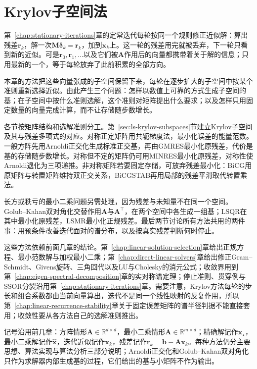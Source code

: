 \chapter{Krylov子空间法}
\label{sec:ls-krylov-iterations}
\label{chap:krylov-methods}

第~\ref{chap:stationary-iterations}章的定常迭代每轮按同一个规则修正近似解：算出残差$\bm r_k$，解一次$\bm M\bm\delta_k=\bm r_k$，加到$\bm x_k$上。这一轮的残差用完就被丢弃，下一轮只看到新的近似。可是$\bm r_0,\bm r_1,\ldots$以及它们被$\bm A$作用后的向量都携带着关于解的信息；只用最新的一个，等于每轮放弃了此前积累的全部方向。

本章的方法把这些向量张成的子空间保留下来，每轮在逐步扩大的子空间中按某个准则重新选择近似。由此产生三个问题：怎样以数值上可靠的方式生成子空间的基；在子空间中按什么准则选解，这个准则对矩阵提出什么要求；以及怎样只用固定数量的向量完成计算，而不让存储随步数增长。

各节按矩阵结构和选解准则分工。第~\ref{sec:ls-krylov-subspaces}节建立Krylov子空间及其与残差多项式的对应。对称正定矩阵用共轭梯度法，最小化误差的能量范数。一般方阵先用Arnoldi正交化生成标准正交基，再由GMRES最小化原残差，代价是基的存储随步数增长。对称但不定的矩阵仍可用MINRES最小化原残差，对称性使Arnoldi退化为三项递推。非对称矩阵若要固定存储，可放弃残差最小化：BiCG用原矩阵与转置矩阵维持双正交关系，BiCGSTAB再用局部的残差平滑取代转置乘法。

长方或秩亏的最小二乘问题另需处理，因为残差与未知量不在同一个空间。Golub--Kahan双对角化交替作用$\bm A$与$\bm A^\top$，在两个空间中各生成一组基；LSQR在其中最小化原残差，LSMR最小化正规残差。最后两节讨论所有方法共用的两件事：用预条件改善迭代面对的谱分布，以及按真实残差判断何时停止。

这些方法依赖前面几章的结论。第~\ref{chap:linear-solution-selection}章给出正规方程、最小范数解与加权最小二乘；第~\ref{chap:direct-linear-solvers}章给出修正Gram--Schmidt、Givens旋转、三角回代以及LU与Cholesky的消元公式；收敛界用到第~\ref{chap:eigen-spectral-decomposition}章的实对称谱定理；停止准则、贯穿例与SSOR分裂沿用第~\ref{chap:stationary-iterations}章。需要注意，Krylov方法每轮的步长和组合系数都由当前向量算出，迭代不是同一个线性映射的反复作用，所以第~\ref{chap:linear-recurrence-stability}章关于固定误差矩阵的谱半径判据不能直接套用；收敛性要从各方法自己的选解准则推出。

记号沿用前几章：方阵情形$\bm A\in\mathbb R^{d\times d}$，最小二乘情形$\bm A\in\mathbb R^{m\times d}$；精确解记作$\bm x_\star$，最小二乘解记作$\hat{\bm x}$，迭代近似记作$\bm x_k$，残差记作$\bm r_k=\bm b-\bm A\bm x_k$。每种方法仍分主要思想、算法实现与算法分析三部分说明；Arnoldi正交化和Golub--Kahan双对角化只作为求解器内部生成基的过程，它们给出的基与小矩阵不作为输出。

